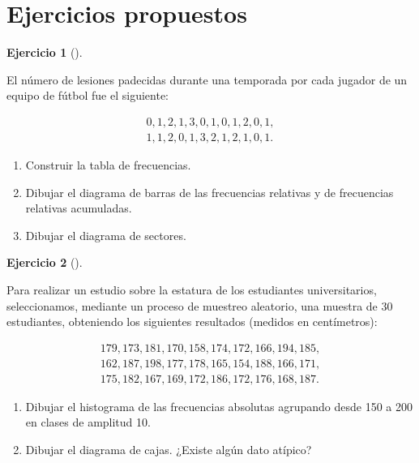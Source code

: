 \documentclass[
  spanish,
  a4paper,
]{scrreport}
\theoremstyle{definition}
\newtheorem{exercise}{Ejercicio}[chapter]
\theoremstyle{remark}
\begin{document}
\section{Ejercicios propuestos}\label{ejercicios-propuestos-2}

\begin{exercise}[]\protect\hypertarget{exr-frecuencias-graficos-lesiones}{}\label{exr-frecuencias-graficos-lesiones}

El número de lesiones padecidas durante una temporada por cada jugador
de un equipo de fútbol fue el siguiente:

\[
\begin{array}{c}
0, 1, 2, 1, 3, 0, 1, 0, 1, 2, 0, 1, \\
1, 1, 2, 0, 1, 3, 2, 1, 2, 1, 0, 1.
\end{array}
\]

\begin{enumerate}
\def\labelenumi{\alph{enumi}.}
\item
  Construir la tabla de frecuencias.
\item
  Dibujar el diagrama de barras de las frecuencias relativas y de
  frecuencias relativas acumuladas.
\item
  Dibujar el diagrama de sectores.
\end{enumerate}

\end{exercise}

\begin{exercise}[]\protect\hypertarget{exr-frecuencias-graficos-estaturas}{}\label{exr-frecuencias-graficos-estaturas}

Para realizar un estudio sobre la estatura de los estudiantes
universitarios, seleccionamos, mediante un proceso de muestreo
aleatorio, una muestra de 30 estudiantes, obteniendo los siguientes
resultados (medidos en centímetros):

\[
\begin{array}{c}
179, 173, 181, 170, 158, 174, 172, 166, 194, 185,\\
162, 187, 198, 177, 178, 165, 154, 188, 166, 171,\\
175, 182, 167, 169, 172, 186, 172, 176, 168, 187.
\end{array}
\]

\begin{enumerate}
\def\labelenumi{\alph{enumi}.}
\item
  Dibujar el histograma de las frecuencias absolutas agrupando desde 150
  a 200 en clases de amplitud 10.
\item
  Dibujar el diagrama de cajas. ¿Existe algún dato atípico?
\end{enumerate}

\end{exercise}
\end{document}
